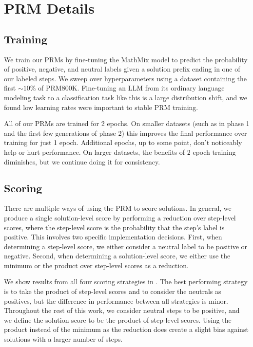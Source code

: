 \documentclass{article}
\begin{document}
\newpage

\section{PRM Details} \label{appendix:prm_details}

\subsection{Training}

We train our PRMs by fine-tuning the MathMix model to predict the probability of positive, negative, and neutral labels given a solution prefix ending in one of our labeled steps. We sweep over hyperparameters using a dataset containing the first $\sim\!10\%$ of PRM800K. Fine-tuning an LLM from its ordinary language modeling task to a classification task like this is a large distribution shift, and we found low learning rates were important to stable PRM training.

All of our PRMs are trained for 2 epochs. On smaller datasets (such as in phase 1 and the first few generations of phase 2) this improves the final performance over training for just 1 epoch. Additional epochs, up to some point, don't noticeably help or hurt performance. On larger datasets, the benefits of 2 epoch training diminishes, but we continue doing it for consistency.

\subsection{Scoring}

There are multiple ways of using the PRM to score solutions. In general, we produce a single solution-level score by performing a reduction over step-level scores, where the step-level score is the probability that the step's label is positive. This involves two specific implementation decisions. First, when determining a step-level score, we either consider a neutral label to be positive or negative. Second, when determining a solution-level score, we either use the minimum or the product over step-level scores as a reduction.

We show results from all four scoring strategies in . The best performing strategy is to take the product of step-level scores and to consider the neutrals as positives, but the difference in performance between all strategies is minor. Throughout the rest of this work, we consider neutral steps to be positive, and we define the solution score to be the product of step-level scores. Using the product instead of the minimum as the reduction does create a slight bias against solutions with a larger number of steps.
\end{document}
